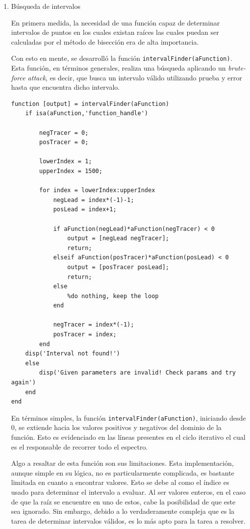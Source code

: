 \documentclass[english,notitlepage,letterpaper, 10pt]{article} %
\begin{document}
\begin{enumerate}
    \begin{enumerate}

      \item Búsqueda de intervalos
      
      En primera medida, la necesidad de una función capaz de determinar intervalos de puntos en los cuales existan raíces las cuales puedan ser calculadas por el método de bisección era de alta importancia.
      
      Con esto en mente, se desarrolló la función \texttt{intervalFinder(aFunction)}. Esta función, en términos generales, realiza una búsqueda aplicando un \textit{brute-force attack}, es decir, que busca un intervalo válido utilizando prueba y error hasta que encuentra dicho intervalo.

      \begin{lstlisting}
function [output] = intervalFinder(aFunction)
    if isa(aFunction,'function_handle')

        negTracer = 0;
        posTracer = 0;
        
        lowerIndex = 1;
        upperIndex = 1500;
        
        for index = lowerIndex:upperIndex        
            negLead = index*(-1)-1;
            posLead = index+1;
            
            if aFunction(negLead)*aFunction(negTracer) < 0
                output = [negLead negTracer];
                return;
            elseif aFunction(posTracer)*aFunction(posLead) < 0
                output = [posTracer posLead];
                return;
            else
                %do nothing, keep the loop
            end

            negTracer = index*(-1);
            posTracer = index;
        end
    disp('Interval not found!')    
    else
        disp('Given parameters are invalid! Check params and try again')
    end
end
      \end{lstlisting}

      En términos simples, la función \texttt{intervalFinder(aFunction)}, iniciando desde 0, se extiende hacia los valores positivos y negativos del dominio de la función. Esto es evidenciado en las líneas presentes en el ciclo iterativo el cual es el responsable de recorrer todo el espectro. 
      
      Algo a resaltar de esta función son sus limitaciones. Esta implementación, aunque simple en su lógica, no es particularmente complicada, es bastante limitada en cuanto a encontrar valores. Esto se debe al como el índice es usado para determinar el intervalo a evaluar. Al ser valores enteros, en el caso de que la raíz se encuentre en uno de estos, cabe la posibilidad de que este sea ignorado. Sin embargo, debido a lo verdaderamente compleja que es la tarea de determinar intervalos válidos, es lo más apto para la tarea a resolver.


\end{enumerate}
\end{enumerate}
\end{document}
